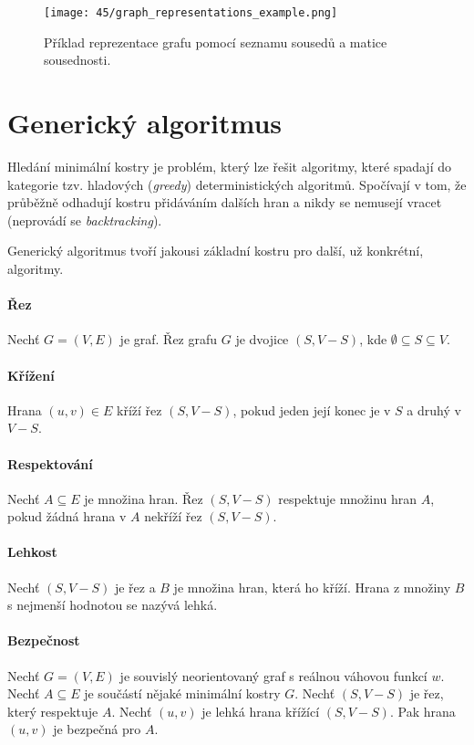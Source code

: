 \begin{figure}[H]
    \centering
    \texttt{[image: 45/graph\_representations\_example.png]}
    \caption{Příklad reprezentace grafu pomocí seznamu sousedů a matice sousednosti.}
\end{figure}


\section{Generický algoritmus}

Hledání minimální kostry je problém, který lze řešit algoritmy, které spadají do kategorie tzv. hladových (\textit{greedy}) deterministických algoritmů. Spočívají v tom, že průběžně odhadují kostru přidáváním dalších hran a nikdy se nemusejí vracet (neprovádí se \textit{backtracking}).

\bigskip

\noindent Generický algoritmus tvoří jakousi základní kostru pro další, už konkrétní, algoritmy.

\paragraph*{Řez} Nechť $G = (V, E)$ je graf. Řez grafu $G$ je dvojice $(S, V - S)$, kde $\emptyset \subseteq S \subseteq V$.

\paragraph*{Křížení} Hrana $(u, v) \in E$ kříží řez $(S, V - S)$, pokud jeden její konec je v $S$ a druhý v $V - S$.

\paragraph*{Respektování} Nechť $A \subseteq E$ je množina hran. Řez $(S, V - S)$ respektuje množinu hran $A$, pokud žádná hrana v $A$ nekříží řez $(S, V - S)$.

\paragraph*{Lehkost} Nechť $(S, V - S)$ je řez a $B$ je množina hran, která ho kříží. Hrana z množiny $B$ s nejmenší hodnotou se nazývá lehká.

\paragraph*{Bezpečnost} Nechť $G = (V, E)$ je souvislý neorientovaný graf s reálnou váhovou funkcí $w$. Nechť $A \subseteq E$ je součástí nějaké minimální kostry $G$. Nechť $(S, V - S)$ je řez, který respektuje $A$. Nechť $(u, v)$ je lehká hrana křížící $(S, V - S)$. Pak hrana $(u, v)$ je bezpečná pro $A$.

